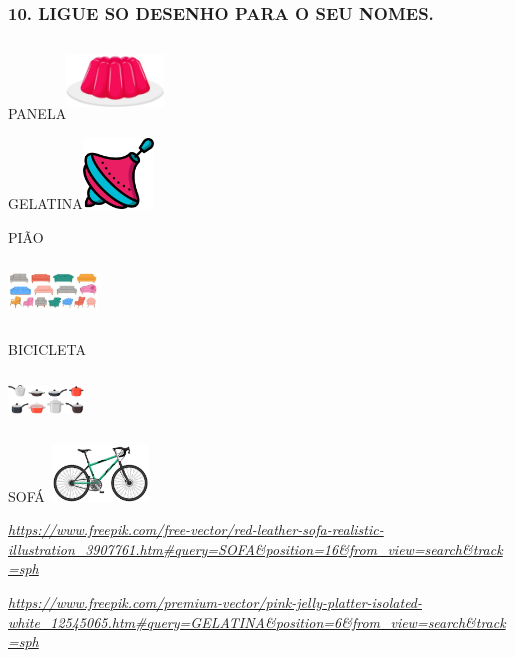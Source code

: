 \subsubsection{10. LIGUE SO DESENHO PARA O SEU
NOMES.}\label{ligue-so-desenho-para-o-seu-nomes.}

PANELA\includegraphics[width=1.02083in,height=0.81667in]{media/image43.png}

GELATINA\includegraphics[width=0.75000in,height=0.73958in]{media/image44.png}

PIÃO

\includegraphics[width=0.93750in,height=0.62014in]{media/image45.jpg}

BICICLETA

\includegraphics[width=0.79167in,height=0.55208in]{media/image46.png}

SOFÁ\includegraphics[width=1.16667in,height=0.59375in]{media/image48.png}

\href{https://www.freepik.com/free-vector/red-leather-sofa-realistic-illustration_3907761.htm\#query=SOFA\&position=16\&from_view=search\&track=sph}{\emph{https://www.freepik.com/free-vector/red-leather-sofa-realistic-illustration\_3907761.htm\#query=SOFA\&position=16\&from\_view=search\&track=sph}}

\href{https://www.freepik.com/premium-vector/pink-jelly-platter-isolated-white_12545065.htm\#query=GELATINA\&position=6\&from_view=search\&track=sph}{\emph{https://www.freepik.com/premium-vector/pink-jelly-platter-isolated-white\_12545065.htm\#query=GELATINA\&position=6\&from\_view=search\&track=sph}}

